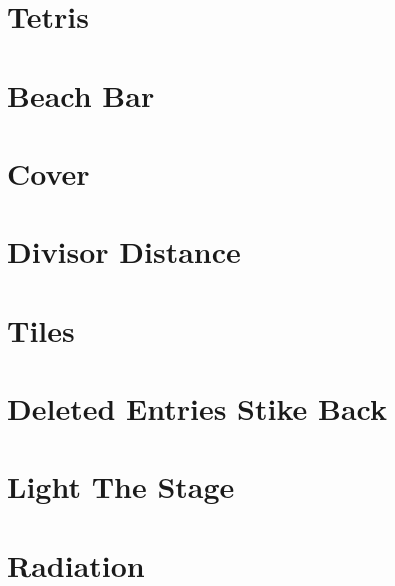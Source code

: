 \documentclass[a4paper, 10pt]{article}
\let\stdsection\section
\renewcommand\section{\newpage\stdsection}
\newcommand{\includecode}[1]{
    }
\newcommand{\algoAuthor}{2} %
\begin{document}
    \section{Tetris}
        \label{sec:tetris}
        \includecode{../problems/w10/Tetris/Tetris\algoAuthor.cpp}
 
    
    \section{Beach Bar}
        \label{sec:beach_bar}
        \includecode{../problems/w11/Beach_Bar/BeachBar\algoAuthor.cpp}
        
    \section{Cover}
        \label{sec:cover}
        \includecode{../problems/w11/Cover/Cover\algoAuthor.cpp}
        
    \section{Divisor Distance}
        \label{sec:divisor_distance}
        \includecode{../problems/w11/Divisor_Distance/DivisorDistance\algoAuthor.cpp}
        
    \section{Tiles}
        \label{sec:tiles}
        \includecode{../problems/w11/Tiles/Tiles\algoAuthor.cpp}
        
    
    \section{Deleted Entries Stike Back}
        \label{sec:deleted_entries_strike_back}
        \includecode{../problems/w12/Deleted_Entries_Strike_Back/DeletedEntriesStrikeBack\algoAuthor.cpp}
        
    \section{Light The Stage}
        \label{sec:light_the_stage}
        \includecode{../problems/w12/Light_The_Stage/LightTheStage\algoAuthor.cpp}
        
    \section{Radiation}
        \label{sec:radiation}
        \includecode{../problems/w12/Radiation/Radiation\algoAuthor.cpp}
        
\end{document}
